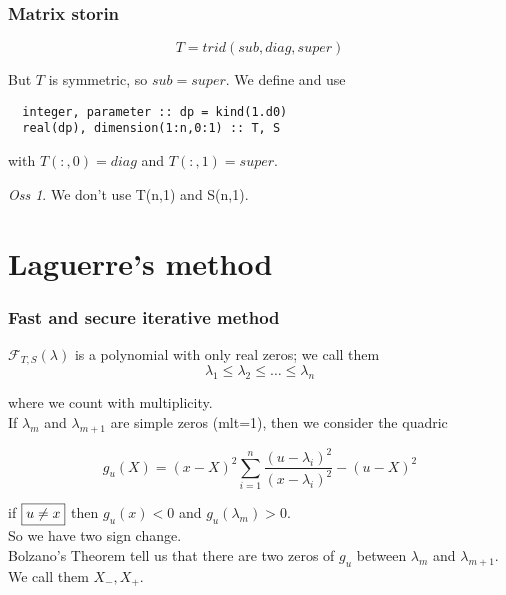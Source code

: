 \documentclass{beamer}
\newcommand{\effe}[2]{\mathcal{F}_{#1}(#2)}
\theoremstyle{definition} \newtheorem{de}{Def}
\theoremstyle{remark} \newtheorem{os}[de]{Oss}
\theoremstyle{plain} \newtheorem{te}[de]{Teo}
\theoremstyle{plain} \newtheorem{co}[de]{Cor}
\theoremstyle{plain} \newtheorem{pr}[de]{Prop}
\theoremstyle{plain} \newtheorem{lem}[de]{Lemm}
\theoremstyle{remark} \newtheorem{rem}[de]{Remark}
\begin{document}
\begin{frame}[fragile]
\frametitle{Matrix storin}

\begin{equation*}
  T = trid(sub,diag,super)
\end{equation*}

But $T$ is symmetric, so $sub=super$. We define and use

\begin{lstlisting}
  integer, parameter :: dp = kind(1.d0)
  real(dp), dimension(1:n,0:1) :: T, S  
\end{lstlisting}

with $T(:,0)=diag$ and $T(:,1)=super$.

\begin{os}
  We don't use T(n,1) and S(n,1). 
\end{os}

\end{frame}

\section{Laguerre's method}

\begin{frame}
\frametitle{Fast and secure iterative method}

$\effe{T,S}{\lambda}$ is a polynomial with only real zeros; we call them
\begin{equation*}
  \lambda_1 \le \lambda_2 \le \dots \le \lambda_n
\end{equation*}

where we count with multiplicity.\\ 
If $\lambda_m$ and $\lambda_{m+1}$ are simple zeros (mlt=1), then we consider the quadric

\begin{equation*}
  g_{u}(X) = (x-X)^2 \sum_{i=1}^n \frac{(u-\lambda_i)^2}{(x-\lambda_i)^2} - (u-X)^2
\end{equation*}

if $\fbox{$u\neq x$}$ then $g_u(x)<0$ and $g_u(\lambda_m)>0$. \\
So we have two sign change. \\
Bolzano's Theorem tell us that there are two zeros of $g_u$ between $\lambda_m$ and $\lambda_{m+1}$. We call them $X_{-},X_{+}$.

\end{frame}
\end{document}
